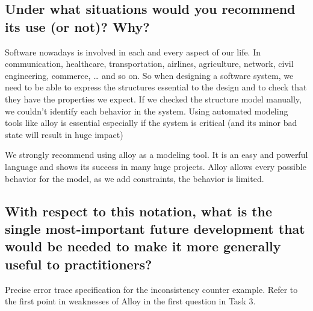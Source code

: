 \documentclass[titlepage]{article}
\begin{document}
\subsection{Under what situations would you recommend its use (or not)? Why?}
Software nowadays is involved in each and every aspect of our life. In communication, healthcare, transportation, airlines, agriculture, network, civil engineering, commerce, … and so on. So when designing a software system, we need to be able to express the structures essential to the design and to check that they have the properties we expect. If we checked the structure model manually, we couldn’t identify each behavior in the system. Using automated modeling tools like alloy is essential especially if the system is critical (and its minor bad state will result in huge impact)

We strongly recommend using alloy as a modeling tool. It is an easy and powerful language and shows its success in many huge projects. Alloy allows every possible behavior for the model, as we add constraints, the behavior is limited.

\subsection{With respect to this notation, what is the single most-important future development that would be needed to
	make it more generally useful to practitioners?}

	Precise error trace specification for the inconsistency counter example. Refer to the first point in weaknesses of Alloy in the first question in Task 3.
\end{document}
